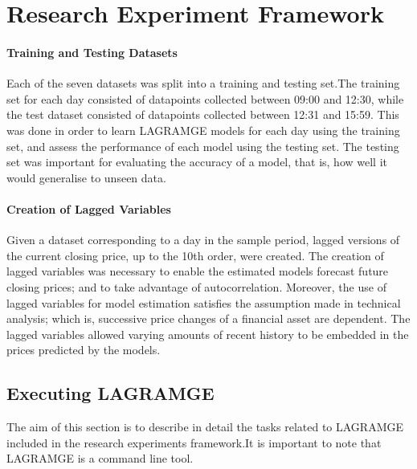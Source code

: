 \documentclass[13pt]{report}
\begin{document}
\section{Research Experiment Framework}


\paragraph{Training and Testing Datasets}\hfill \break
Each of the seven datasets was split into a training and testing set.The training set for each day consisted of datapoints collected between 09:00 and 12:30, while the test dataset consisted of datapoints collected between 12:31 and 15:59. This was done in order to learn LAGRAMGE models for each day using the training set, and assess the performance of each model using the testing set. The testing set was important for evaluating the accuracy of a model, that is, how well it would generalise to unseen data.

\paragraph{Creation of Lagged Variables}\hfill \break
Given a dataset corresponding to a day in the sample period, lagged versions of the current closing price, up to the 10th order, were created. The creation of lagged variables was necessary to enable the estimated models forecast future closing prices; and to take advantage of autocorrelation. Moreover, the use of lagged variables for model estimation satisfies the assumption made in technical analysis; which is, successive price changes of a financial asset are dependent. The lagged variables allowed varying amounts of recent history to be embedded in the prices predicted by the models.  


 
\subsection{Executing LAGRAMGE}
The aim of this section is to describe in detail the tasks related to LAGRAMGE included in the research experiments framework.It is important to note that LAGRAMGE is a command line tool.
\end{document}
